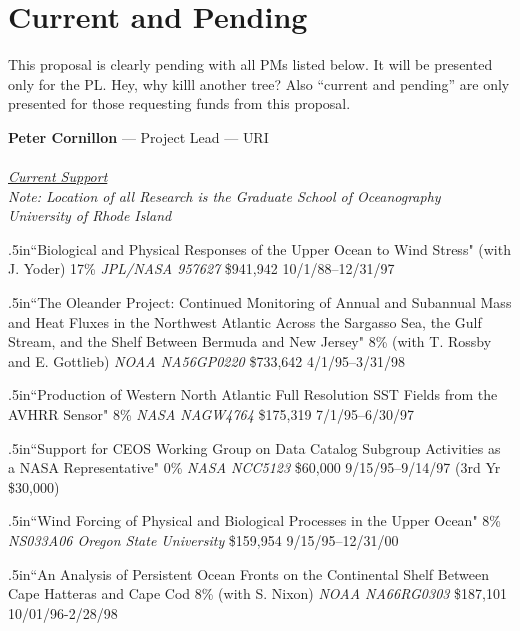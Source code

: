 \documentclass[12pt]{article}
\begin{document}
\section{Current and Pending}\label{current-and-pending}
\def\Hpar{\goodbreak\par\hangindent .5in\hangafter=1}

This proposal is clearly pending with all \ac{PM}s listed below. It will
be presented only for the \ac{PL}. Hey, why killl another tree? Also
``current and pending'' are only presented for those requesting funds
from this proposal.

\begin{center}
{\large  {\bf Peter Cornillon} --- Project Lead --- \acs{URI}\\
\ \\
\vspace{.08in} \underline {\it Current Support}}\\
\vspace{.08in} {\small {\it Note:  Location of all Research is the
    Graduate School of Oceanography\\University of Rhode Island}}
\end{center}

\Hpar ``Biological and Physical Responses of the Upper Ocean to Wind Stress" 
(with J. Yoder) 17\% {\em JPL/NASA 957627} \$941,942  10/1/88--12/31/97

\Hpar ``The Oleander Project: Continued Monitoring of Annual and Subannual Mass
and Heat Fluxes in the Northwest Atlantic Across the Sargasso Sea, the 
Gulf Stream, and the Shelf Between Bermuda and New Jersey" 8\% (with T. Rossby 
and E. Gottlieb) {\em NOAA NA56GP0220} \$733,642 4/1/95--3/31/98

\Hpar ``Production of Western North Atlantic Full Resolution SST Fields from 
the AVHRR Sensor" 8\% {\em NASA NAGW4764} \$175,319  7/1/95--6/30/97

\Hpar ``Support for CEOS Working Group on Data Catalog Subgroup Activities 
as a NASA Representative" 0\% {\em NASA NCC5123} \$60,000   9/15/95--9/14/97
(3rd Yr \$30,000)

\Hpar ``Wind Forcing of Physical and Biological Processes in the Upper Ocean"
8\% {\em NS033A06  Oregon State University} \$159,954  9/15/95--12/31/00

\Hpar ``An Analysis of Persistent Ocean Fronts on the Continental Shelf Between
Cape Hatteras and Cape Cod 8\%  (with S. Nixon) {\em NOAA NA66RG0303} \$187,101   
10/01/96-2/28/98
\end{document}
